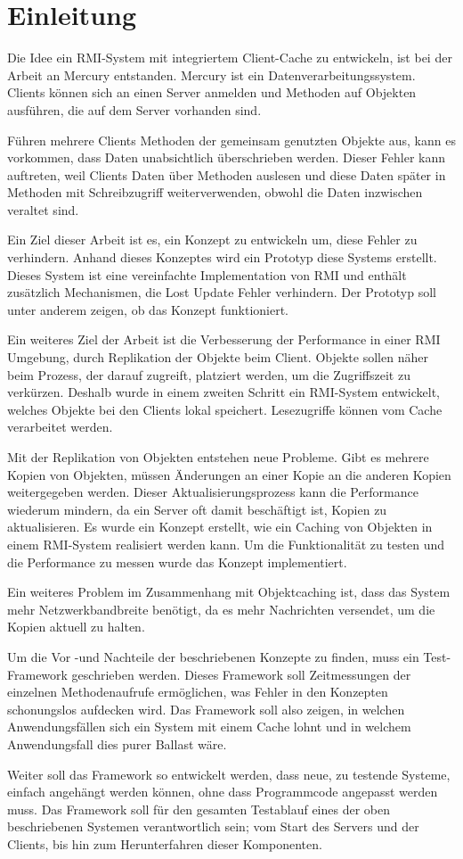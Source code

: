 \chapter{Einleitung}

Die Idee ein RMI-System mit integriertem Client-Cache zu entwickeln, ist bei der Arbeit an Mercury entstanden. Mercury ist ein Datenverarbeitungssystem. Clients können sich an einen Server anmelden und Methoden auf Objekten ausführen, die auf dem Server vorhanden sind. 

Führen mehrere Clients Methoden der gemeinsam genutzten Objekte aus, kann es vorkommen, dass Daten unabsichtlich überschrieben werden. Dieser Fehler kann auftreten, weil Clients Daten über Methoden auslesen und diese Daten später in Methoden mit Schreibzugriff weiterverwenden, obwohl die Daten inzwischen veraltet sind.

Ein Ziel dieser Arbeit ist es, ein Konzept zu entwickeln um, diese Fehler zu verhindern. Anhand dieses Konzeptes wird ein Prototyp diese Systems erstellt. Dieses System ist eine vereinfachte Implementation von RMI und enthält zusätzlich Mechanismen, die Lost Update Fehler verhindern. Der Prototyp soll unter anderem zeigen, ob das Konzept funktioniert. 

Ein weiteres Ziel der Arbeit ist die Verbesserung der Performance in einer RMI Umgebung, durch Replikation der Objekte beim Client. Objekte sollen näher beim Prozess, der darauf zugreift, platziert werden, um die Zugriffszeit zu verkürzen. Deshalb wurde in einem zweiten Schritt ein RMI-System entwickelt, welches Objekte bei den Clients lokal speichert. Lesezugriffe können vom Cache verarbeitet werden.

Mit der Replikation von Objekten entstehen neue Probleme. Gibt es mehrere Kopien von Objekten, müssen Änderungen an einer Kopie an die anderen Kopien weitergegeben werden. Dieser Aktualisierungsprozess kann die Performance wiederum mindern, da ein Server oft damit beschäftigt ist, Kopien zu aktualisieren. Es wurde ein Konzept erstellt, wie ein Caching von Objekten in einem RMI-System realisiert werden kann. Um die Funktionalität zu testen und die Performance zu messen wurde das Konzept implementiert. 

Ein weiteres Problem im Zu\-sam\-men\-hang mit Objekt\-caching ist, dass das Sy\-stem mehr Netzwerkbandbreite benötigt, da es mehr Nachrichten versendet, um die Kopien aktuell zu halten.

Um die Vor -und Nachteile der beschriebenen Konzepte zu finden, muss ein Test-Framework geschrieben werden. Dieses Framework soll Zeitmessungen der einzelnen Methodenaufrufe ermöglichen, was Fehler in den Konzepten schonungslos aufdecken wird. Das Framework soll also zeigen, in welchen Anwendungsfällen sich ein System mit einem Cache lohnt und in welchem Anwendungsfall dies purer Ballast wäre.

Weiter soll das Framework so entwickelt werden, dass neue, zu testende Systeme, einfach angehängt werden können, ohne dass Programmcode angepasst werden muss. Das Framework soll für den gesamten Testablauf eines der oben beschriebenen Systemen verantwortlich sein; vom Start des Servers und der Clients, bis hin zum Herunterfahren dieser Komponenten.

